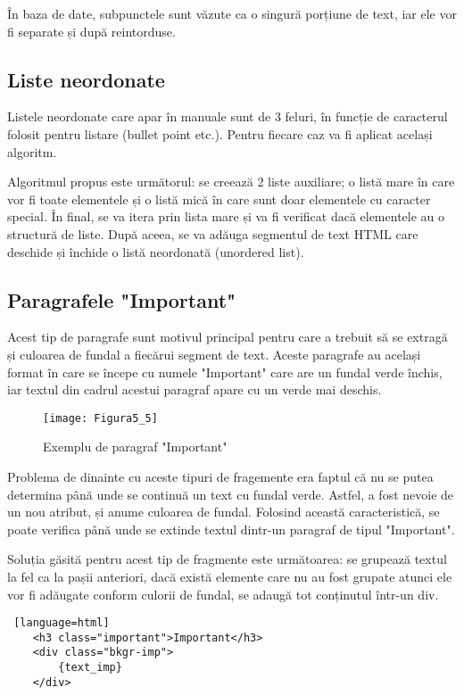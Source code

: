 În baza de date, subpunctele sunt văzute ca o singură porțiune de text, iar ele vor fi separate și după reintorduse.


\subsection{Liste neordonate}

Listele neordonate care apar în manuale sunt de 3 feluri, în funcție de caracterul folosit pentru listare (bullet point etc.). Pentru fiecare caz va fi aplicat același algoritm.

Algoritmul propus este următorul: se creează 2 liste auxiliare; o listă mare în care vor fi toate elementele și o listă mică în care sunt doar elementele cu caracter special. În final, se va itera prin lista mare și va fi verificat dacă elementele au o structură de liste. După aceea, se va adăuga segmentul de text HTML care deschide și închide o listă neordonată (unordered list).


\subsection{Paragrafele "Important"}

Acest tip de paragrafe sunt motivul principal pentru care a trebuit să se extragă și culoarea de fundal a fiecărui segment de text. Aceste paragrafe au același format în care se începe cu numele "Important" care are un fundal verde închis, iar textul din cadrul acestui paragraf apare cu un verde mai deschis.
\begin{figure}[H]
	\centering
	\texttt{[image: Figura5\_5]}
	\caption{Exemplu de paragraf "Important"}
	\label{fig:Figura5_5}
\end{figure}

Problema de dinainte cu aceste tipuri de fragemente era faptul că nu se putea determina până unde se continuă un text cu fundal verde. Astfel, a fost nevoie de un nou atribut, și anume culoarea de fundal. Folosind această caracteristică, se poate verifica până unde se extinde textul dintr-un paragraf de tipul "Important".

Soluția găsită pentru acest tip de fragmente este următoarea: se grupează textul la fel ca la pașii anteriori, dacă există elemente care nu au fost grupate atunci ele vor fi adăugate conform culorii de fundal, se adaugă tot conținutul într-un div.

\vspace{1em}
\begin{lstlisting} [language=html]
	<h3 class="important">Important</h3>
	<div class="bkgr-imp">
		{text_imp}
	</div>
\end{lstlisting}

